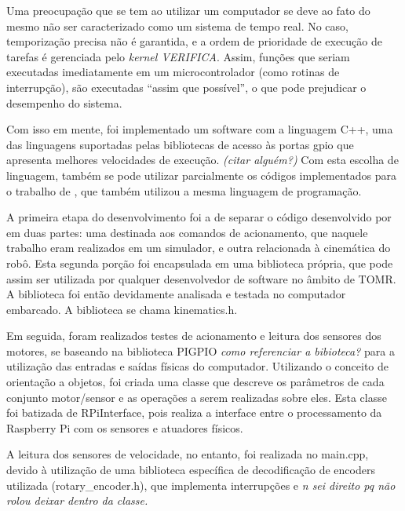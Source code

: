 Uma preocupação que se tem ao utilizar um computador se deve ao fato do mesmo não ser caracterizado como um sistema de tempo real. No caso, temporização precisa não é garantida, e a ordem de prioridade de execução de tarefas é gerenciada pelo \textit{kernel VERIFICA}. Assim, funções que seriam executadas imediatamente em um microcontrolador (como rotinas de interrupção), são executadas ``assim que possível'', o que pode prejudicar o desempenho do sistema.

Com isso em mente, foi implementado um software com a linguagem C++, uma das linguagens suportadas pelas bibliotecas de acesso às portas \acrshort{gpio} que apresenta melhores velocidades de execução. \textit{(citar alguém?)} Com esta escolha de linguagem, também se pode utilizar parcialmente os códigos implementados para o trabalho de \citet{ritter2016modelagem}, que também utilizou a mesma linguagem de programação.


A primeira etapa do desenvolvimento foi a de separar o código desenvolvido por \citet{ritter2016modelagem} em duas partes: uma destinada aos comandos de acionamento, que naquele trabalho eram realizados em um simulador, e outra relacionada à cinemática do robô. Esta segunda porção foi encapsulada em uma biblioteca própria, que pode assim ser utilizada por qualquer desenvolvedor de software no âmbito de TOMR. A biblioteca foi então devidamente analisada e testada no computador embarcado. A biblioteca se chama kinematics.h.

Em seguida, foram realizados testes de acionamento e leitura dos sensores dos motores, se baseando na biblioteca PIGPIO \textit{como referenciar a bibioteca?} \citep{pigpio} para a utilização das entradas e saídas físicas do computador. Utilizando o conceito de orientação a objetos, foi criada uma classe que descreve os parâmetros de cada conjunto motor/sensor e as operações a serem realizadas sobre eles. Esta classe foi batizada de RPiInterface, pois realiza a interface entre o processamento da Raspberry Pi com os sensores e atuadores físicos.

A leitura dos sensores de velocidade, no entanto, foi realizada no main.cpp, devido à utilização de uma biblioteca específica de decodificação de encoders utilizada (rotary\_encoder.h), que implementa interrupções e \textit{n sei direito pq não rolou deixar dentro da classe.}

